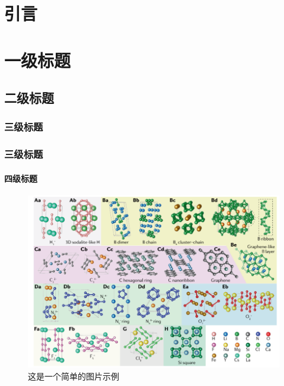 \documentclass[zihao = -4,linespread = 1.38889, heading = true,no-math]{ctexbook} %
\begin{document}
\makecover %


\begin{cnabstract}
  \zhlipsum[1-2]%
\end{cnabstract}


\begin{enabstract}
  \lipsum[1-3]%
\end{enabstract}


\tableofcontents
\cleardoublepage

\setcounter{page}{1}
\chapter{引言}
\zhlipsum[1]

\chapter{一级标题}
\zhlipsum[1]
\section{二级标题}
\zhlipsum[1-3]
\subsection{三级标题}
\zhlipsum[1]
\subsection{三级标题}
\subsubsection{四级标题}
\zhlipsum[1-2]
\begin{figure}
  \centering
  \includegraphics[width = 14cm]{figs/ThisFigure.png}
  \caption{这是一个简单的图片示例}
\end{figure}
\zhlipsum[3-5]
\end{document}

